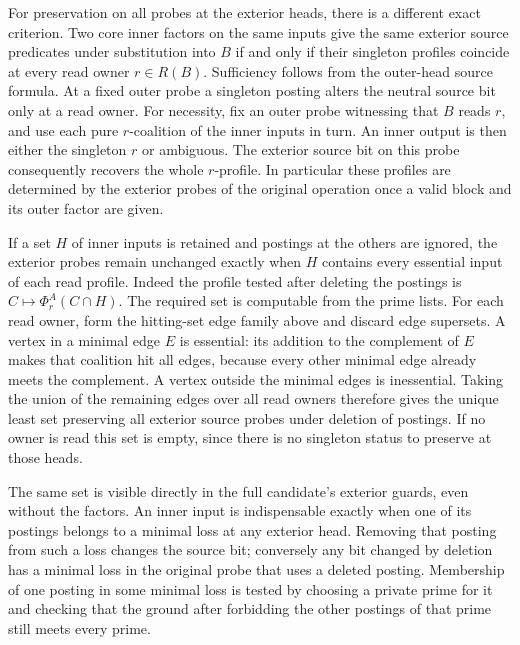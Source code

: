 For preservation on all probes at the exterior heads, there is a
different exact criterion. Two core inner factors on the same
inputs give the same exterior source predicates under substitution
into $B$ if and only if their singleton profiles coincide at every
read owner $r\in R(B)$. Sufficiency follows from the outer-head
source formula. At a fixed outer probe a singleton posting alters
the neutral source bit only at a read owner. For necessity, fix an
outer probe witnessing that $B$ reads $r$, and use each pure
$r$-coalition of the inner inputs in turn. An inner output is then
either the singleton $r$ or ambiguous. The exterior source bit on
this probe consequently recovers the whole $r$-profile. In
particular these profiles are determined by the exterior probes of
the original operation once a valid block and its outer factor are
given.

If a set $H$ of inner inputs is retained and postings at the others
are ignored, the exterior probes remain unchanged exactly when
$H$ contains every essential input of each read profile. Indeed the
profile tested after deleting the postings is
$C\mapsto\Phi_r^A(C\cap H)$. The required set is computable from
the prime lists. For each read owner, form the hitting-set edge
family above and discard edge supersets. A vertex in a minimal edge
$E$ is essential: its addition to the complement of $E$ makes that
coalition hit all edges, because every other minimal edge already
meets the complement. A vertex outside the minimal edges is
inessential. Taking the union of the remaining edges over all read
owners therefore gives the unique least set preserving all exterior
source probes under deletion of postings. If no owner is read this
set is empty, since there is no singleton status to preserve at
those heads.

The same set is visible directly in the full candidate's exterior
guards, even without the factors. An inner input is indispensable
exactly when one of its postings belongs to a minimal loss at any
exterior head. Removing that posting from such a loss changes the
source bit; conversely any bit changed by deletion has a minimal
loss in the original probe that uses a deleted posting. Membership
of one posting in some minimal loss is tested by choosing a private
prime for it and checking that the ground after forbidding the
other postings of that prime still meets every prime.

